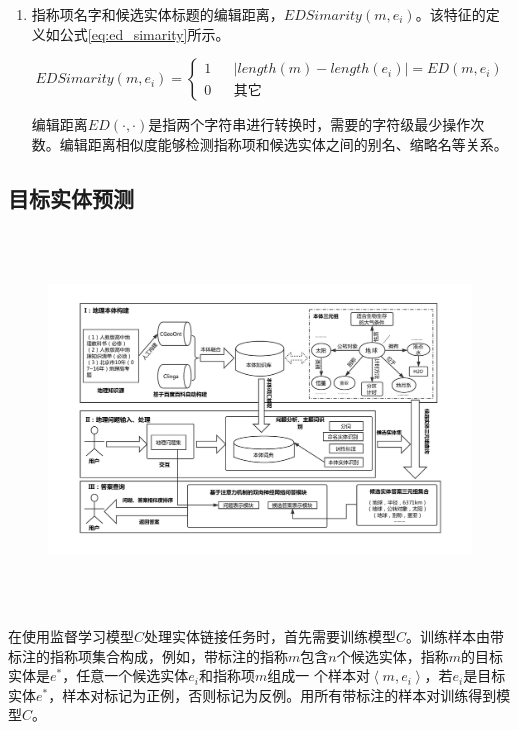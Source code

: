 \begin{enumerate}
{		其中，$anno.e$的定义同上。$anno.m$表示标注记录$anno$的指称项。
	}
	\item 指称项名字和候选实体标题的编辑距离，$EDSimarity(m,e_i)$。该特征的定义如公式\ref{eq:ed_simarity}所示。
	
	\begin{equation}\label{eq:ed_simarity}
	EDSimarity(m,e_i)=
	\left\{
	\begin{array}{rcl}
	1       &      & {|length(m)-length(e_i)|=ED(m,e_i)}\\
	0    &      & {\text{其它}}
	\end{array} \right.
	\end{equation}
	
	编辑距离$ED(\cdot,\cdot)$是指两个字符串进行转换时，需要的字符级最少操作次数。编辑距离相似度能够检测指称项和候选实体之间的别名、缩略名等关系。
\end{enumerate}

\subsection{目标实体预测}
\begin{figure}[!htb]
	\centering\includegraphics[height=10cm]{resource/graduation}
	\label{fig:graduation}
\end{figure}
在使用监督学习模型$C$处理实体链接任务时，首先需要训练模型$C$。训练样本由带标注的指称项集合构成，例如，带标注的指称$m$包含$n$个候选实体，指称$m$的目标实体是$e^*$，任意一个候选实体$e_i$和指称项$m$组成一 个样本对$\left\langle m,e_i\right\rangle $，若$e_i$是目标实体$e^*$，样本对标记为正例，否则标记为反例。用所有带标注的样本对训练得到模型$C$。

